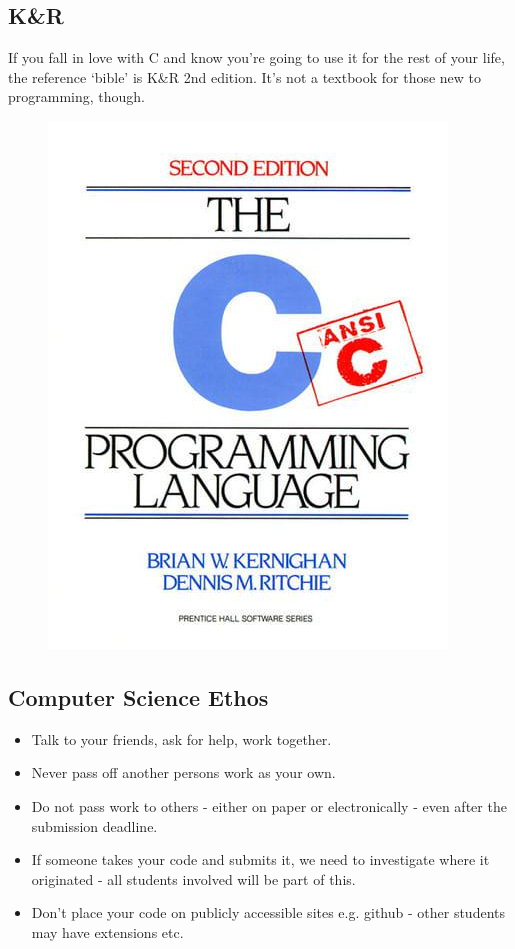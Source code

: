 \documentclass[a4,portraitt]{slides}
\begin{document}
\subsection*{K\&R}
If you fall in love with C and  know you're going to use it for the rest of your life, the reference `bible' is K\&R 2nd edition.
It's not a textbook for those new to programming, though.
\begin{figure}[h]
\centerline{
\includegraphics[scale=0.65]{../Figs/9780131103627.jpg}
}
\end{figure}

\newpage
\subsection*{Computer Science Ethos}
\begin{itemize}
\item Talk to your friends, ask for help, work together.
\item Never pass off another persons work as your own.
\item Do not pass work to others - either on paper or
electronically - even after the submission deadline.
\item If someone takes your code and submits it, we need to investigate where it originated - all students involved
will be part of this.
\item Don't place your code on publicly accessible sites e.g. github - other students may have extensions etc. 
\end{itemize}
\end{document}
